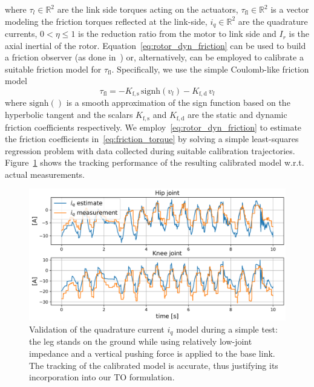 where $\tau_l\in\mathbb{R}^{2}$ are the link side torques acting on the actuators, $\tau_{\mathrm{fl}}\in\mathbb{R}^{2}$ is a vector modeling the friction torques reflected at the link-side, $i_q\in\mathbb{R}^{2}$ are the quadrature currents, $0 < \eta \leq 1$ is the reduction ratio from the motor to link side and $I_r$ is the axial inertial of the rotor. Equation~\eqref{eq:rotor_dyn_friction} can be used to build a friction observer (as done in~\cite{friction_comp::le2008friction}) or, alternatively, can be employed to calibrate a suitable friction model for $\tau_{\mathrm{fl}}$.
Specifically, we use the simple Coulomb-like friction model 
\begin{equation} \label{eq:friction_torque}
\tau_{\mathrm{fl}} = - K_{\mathrm{f, s}}\,\mathrm{signh}({v_l}) - K_{\mathrm{f, d}}\,v_l
\end{equation}
where $\mathrm{signh}()$ is a smooth approximation of the sign function based on the hyperbolic tangent and the scalars $K_{\mathrm{f, s}}$ and $K_{\mathrm{f, d}}$ are the static and dynamic friction coefficients respectively. We employ~\eqref{eq:rotor_dyn_friction} to estimate the friction coefficients in~\eqref{eq:friction_torque} by solving a simple least-squares regression problem with data collected during suitable calibration trajectories. Figure~\ref{fig:iq_model_tracking} shows the tracking performance of the resulting calibrated model w.r.t. actual measurements.
\begin{figure}
    \centering
    \includegraphics[width=1.0\columnwidth]{images/iq_tracking.pdf}
    \caption{Validation of the quadrature current $i_q$ model during a simple test: the leg stands on the ground while using relatively low-joint impedance and a vertical pushing force is applied to the base link. The tracking of the calibrated model is accurate, thus justifying its incorporation into our TO formulation.}
    \label{fig:iq_model_tracking}
\end{figure}
